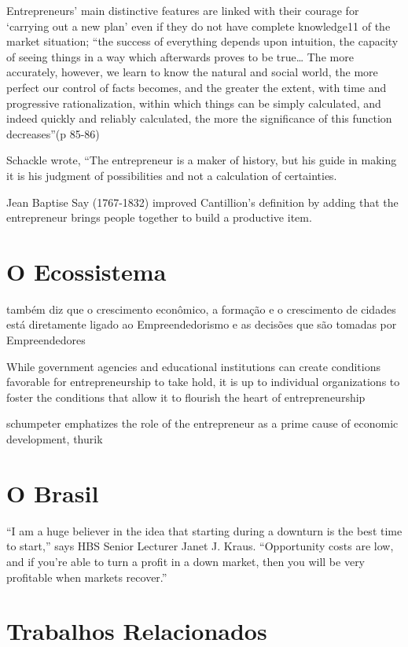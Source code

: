 Entrepreneurs’ main distinctive features are linked with their courage for ‘carrying
out a new plan’ even if they do not have complete knowledge11 of the market situation;
“the success of everything depends upon intuition, the capacity of seeing things in a way
which afterwards proves to be true… The more accurately, however, we learn to know
the natural and social world, the more perfect our control of facts becomes, and the
greater the extent, with time and progressive rationalization, within which things can be
simply calculated, and indeed quickly and reliably calculated, the more the significance of
this function decreases”(p 85-86)

Schackle wrote,
“The entrepreneur is a maker of history, but his guide in making it is his judgment of possibilities
and not a calculation of certainties.	

Jean Baptise Say (1767-1832) improved Cantillion’s definition by adding that the entrepreneur brings people together to build a productive item.



\section{O Ecossistema}
\label{section:ecossistemas_e_suas_pecas}

\cite{James1953} também diz que o crescimento econômico, a formação e o crescimento de cidades está diretamente ligado ao Empreendedorismo e as decisões que são tomadas por Empreendedores

While government agencies and educational institutions can create conditions favorable for entrepreneurship to take hold, it is up to individual organizations to foster the conditions that allow it to flourish the heart of entrepreneurship

schumpeter emphatizes the role of the entrepreneur as a prime cause of economic development,  thurik

\section{O Brasil}

“I am a huge believer in the idea that starting during a downturn is the best time to start,” says HBS Senior Lecturer Janet J. Kraus. “Opportunity costs are low, and if you’re able to turn a profit in a down market, then you will be very profitable when markets recover.”



\section{Trabalhos Relacionados}
\label{section:trabalhos_relacionados}

